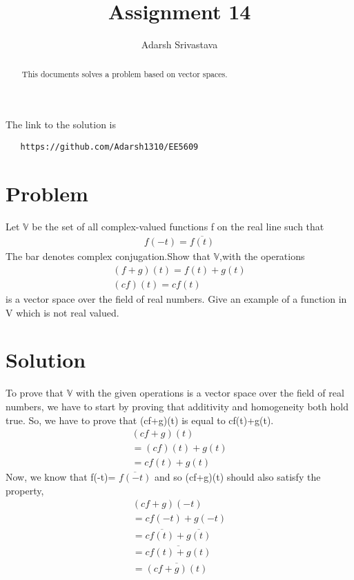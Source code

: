 \documentclass[journal,12pt,twocolumn]{IEEEtran}
\begin{document}
       \def\rightbox#1{\makebox[0in][r]{#1}}
       \def\centbox#1{\makebox[0in]{#1}}
       \def\topbox#1{\raisebox{-\baselineskip}[0in][0in]{#1}}
       \def\midbox#1{\raisebox{-0.5\baselineskip}[0in][0in]{#1}}
  \vspace{3cm}
  \title{Assignment 14}
  \author{Adarsh Srivastava}
  \maketitle
  \newpage
  \bigskip
  \renewcommand{\thetable}{\theenumi}
  The link to the solution is
  \begin{lstlisting}
   https://github.com/Adarsh1310/EE5609
  \end{lstlisting}
  \begin{abstract}
  This documents solves a problem based on vector spaces.
  \end{abstract}
   \section{\textbf{Problem}}
   Let $\mathbb{V}$ be the set of all complex-valued functions f on the real line such that
   \begin{align*}f(-t)=\overline{f(t)}\end{align*}The bar denotes complex conjugation.Show that $\mathbb{V}$,with the operations\begin{align*}(f+g)(t)=f(t)+g(t)\\(cf)(t)=cf(t)\end{align*} is a vector space over the field of real numbers. Give an example of a function in V which is not real valued.
  \section{\textbf{Solution}}
  To prove that $\mathbb{V}$ with the given operations is a vector space over the field of real numbers, we have to start by proving that additivity and homogeneity both hold true.
 So, we have to prove that (cf+g)(t) is equal to cf(t)+g(t).
 \begin{align}
 (cf+g)(t)\\
 =(cf)(t)+g(t)\\
 =cf(t)+g(t)
 \end{align}
 Now, we know that f(-t)= $\overline{f(-t)}$ and so (cf+g)(t) should also satisfy the property,
 \begin{align}
 (cf+g)(-t)\\
 =cf(-t)+g(-t)\\
 =c\overline{f(t)}+\overline{g(t)}\\
 =\overline{cf(t)+g(t)}\\
 =\overline{(cf+g)(t)}
 \end{align}
 
\end{document}
